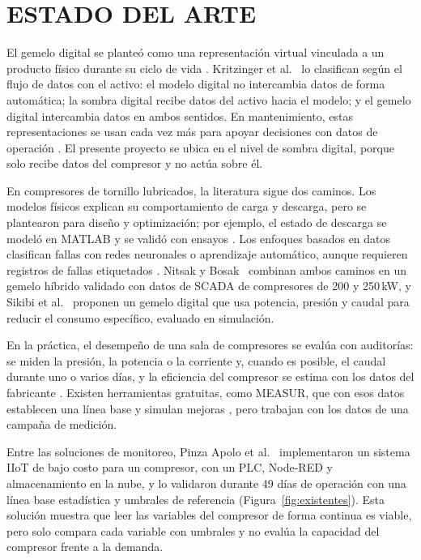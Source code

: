 
\chapter{ESTADO DEL ARTE}

El gemelo digital se planteó como una representación virtual vinculada a un producto físico durante su ciclo de vida \cite{grieves2017,tao2019tii}. Kritzinger et al.~\cite{kritzinger2018} lo clasifican según el flujo de datos con el activo: el modelo digital no intercambia datos de forma automática; la sombra digital recibe datos del activo hacia el modelo; y el gemelo digital intercambia datos en ambos sentidos. En mantenimiento, estas representaciones se usan cada vez más para apoyar decisiones con datos de operación \cite{zhong2023}. El presente proyecto se ubica en el nivel de sombra digital, porque solo recibe datos del compresor y no actúa sobre él.

En compresores de tornillo lubricados, la literatura sigue dos caminos. Los modelos físicos explican su comportamiento de carga y descarga, pero se plantearon para diseño y optimización; por ejemplo, el estado de descarga se modeló en MATLAB y se validó con ensayos \cite{liang2019}. Los enfoques basados en datos clasifican fallas con redes neuronales o aprendizaje automático, aunque requieren registros de fallas etiquetados \cite{talbi2026,daoudi2025}. Nitsak y Bosak~\cite{nitsak2026} combinan ambos caminos en un gemelo híbrido validado con datos de SCADA de compresores de 200 y 250\,kW, y Sikibi et al.~\cite{sikibi2025} proponen un gemelo digital que usa potencia, presión y caudal para reducir el consumo específico, evaluado en simulación.

En la práctica, el desempeño de una sala de compresores se evalúa con auditorías: se miden la presión, la potencia o la corriente y, cuando es posible, el caudal durante uno o varios días, y la eficiencia del compresor se estima con los datos del fabricante \cite{cac2026}. Existen herramientas gratuitas, como MEASUR, que con esos datos establecen una línea base y simulan mejoras \cite{measur2025}, pero trabajan con los datos de una campaña de medición.

Entre las soluciones de monitoreo, Pinza Apolo et al.~\cite{pinzaapolo2026} implementaron un sistema IIoT de bajo costo para un compresor, con un PLC, Node-RED y almacenamiento en la nube, y lo validaron durante 49 días de operación con una línea base estadística y umbrales de referencia (Figura~\ref{fig:existentes}). Esta solución muestra que leer las variables del compresor de forma continua es viable, pero solo compara cada variable con umbrales y no evalúa la capacidad del compresor frente a la demanda.

